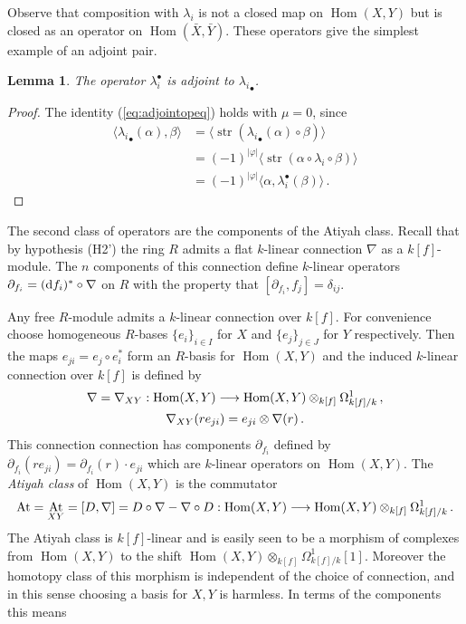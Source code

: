 \documentclass{compositio}
\newtheorem{lemma}[theorem]{Lemma}
\theoremstyle{definition}
\numberwithin{equation}{section}
\def\Hom{\operatorname{Hom}}
\DeclareMathOperator{\str}{str}
\DeclareMathOperator{\At}{At}
\begin{document}
Observe that composition with $\lambda_i$ is not a closed map on $\Hom(X,Y)$ but is closed as an operator on $\Hom(\bar{X}, \bar{Y})$. These operators give the simplest example of an adjoint pair.

\begin{lemma} The operator $\lambda_i^\bullet$ is adjoint to ${\lambda_i}_\bullet$.
\end{lemma}
\begin{proof}
The identity (\ref{eq:adjointopeq}) holds with $\mu = 0$, since
\begin{align*}
\langle {\lambda_i}_\bullet(\alpha), \beta \rangle &= \langle \str( {\lambda_i}_\bullet(\alpha) \circ \beta ) \rangle\\
&= (-1)^{|\varphi|} \langle \str( \alpha \circ \lambda_i \circ \beta ) \rangle\\
&= (-1)^{|\varphi|} \langle \alpha, \lambda_i^\bullet(\beta) \rangle\,.
\end{align*}
\end{proof}

The second class of operators are the components of the Atiyah class. Recall that by hypothesis (H2') the ring $R$ admits a flat $k$-linear connection $\nabla$ as a $k[f]$-module. The $n$ components of this connection define $k$-linear operators $\partial_{f_i} = (\mathrm{d} f_i)^* \circ \nabla$ on $R$ with the property that $[\partial_{f_i}, f_j] = \delta_{ij}$.

Any free $R$-module admits a $k$-linear connection over $k[f]$. For convenience choose homogeneous $R$-bases $\{ e_i \}_{i \in I}$ for $X$ and $\{ e_j \}_{j \in J}$ for $Y$ respectively. Then the maps $e_{ji} = e_j \circ e_i^*$ form an $R$-basis for $\Hom(X,Y)$ and the induced $k$-linear connection over $k[f]$ is defined by
\begin{gather*}
\nabla = \nabla_{XY}: \Hom(X,Y) \lto \Hom(X,Y) \otimes_{k[f]} \Omega^1_{k[f]/k}\,,\\
\nabla_{XY}( r e_{ji} ) = e_{ji} \otimes \nabla(r)\,.
\end{gather*}
This connection connection has components $\partial_{f_i}$ defined by $\partial_{f_i}( r e_{ji} ) = \partial_{f_i}(r) \cdot e_{ji}$ which are $k$-linear operators on $\Hom(X,Y)$. The \emph{Atiyah class} of $\Hom(X,Y)$ is the commutator
\[
\At = \At_{XY} = [D, \nabla] = D \circ \nabla - \nabla \circ D: \Hom(X,Y) \lto \Hom(X,Y) \otimes_{k[f]} \Omega^1_{k[f]/k}\,.
\]
The Atiyah class is $k[f]$-linear and is easily seen to be a morphism of complexes from $\Hom(X,Y)$ to the shift $\Hom(X,Y) \otimes_{k[f]} \Omega^1_{k[f]/k}[1]$. Moreover the homotopy class of this morphism is independent of the choice of connection, and in this sense choosing a basis for $X,Y$ is harmless. In terms of the components this means
\end{document}
